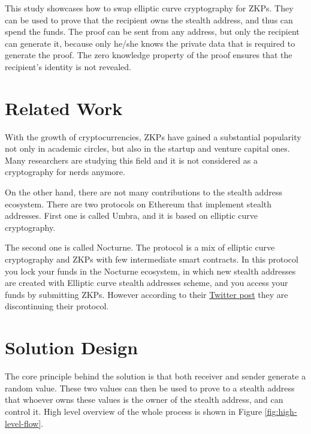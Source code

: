 \documentclass[conference,comsoc,10pt]{IEEEtran}
\begin{document}
        This study showcases how to swap elliptic curve cryptography for ZKPs.
        They can be used to prove that the recipient owns the stealth address, and
        thus can spend the funds. The proof can be sent from any address, but only
        the recipient can generate it, because only he/she knows the private data
        that is required to generate the proof. The zero knowledge property of the
        proof ensures that the recipient's identity is not revealed.

    \section{Related Work}

        With the growth of cryptocurrencies, ZKPs have gained a substantial popularity
        not only in academic circles, but also in the startup and venture capital
        ones. Many researchers are studying this field and it is not considered 
        as a cryptography for nerds anymore.

        On the other hand, there are not many contributions to the stealth address
        ecosystem. There are two protocols on Ethereum that implement stealth addresses.
        First one is called Umbra\cite{umbra}, and it is based on elliptic curve
        cryptography.

        The second one is called Nocturne\cite{nocturne}. The protocol is a mix of
        elliptic curve cryptography and ZKPs with few intermediate smart contracts.
        In this protocol you lock your funds in the Nocturne ecosystem, in which
        new stealth addresses are created with Elliptic curve stealth addresses scheme,
        and you access your funds by submitting ZKPs. However according to their
        \href{https://twitter.com/nocturne_xyz/status/1749510390906511693}{Twitter post}
        they are discontinuing their protocol.

\section{Solution Design}

    The core principle behind the solution is that both
    receiver and sender generate a random value. These two values can then
    be used to prove to a stealth address that whoever owns these values
    is the owner of the stealth address, and can control it. High level
    overview of the whole process is shown in Figure \ref{fig:high-level-flow}.
\end{document}
